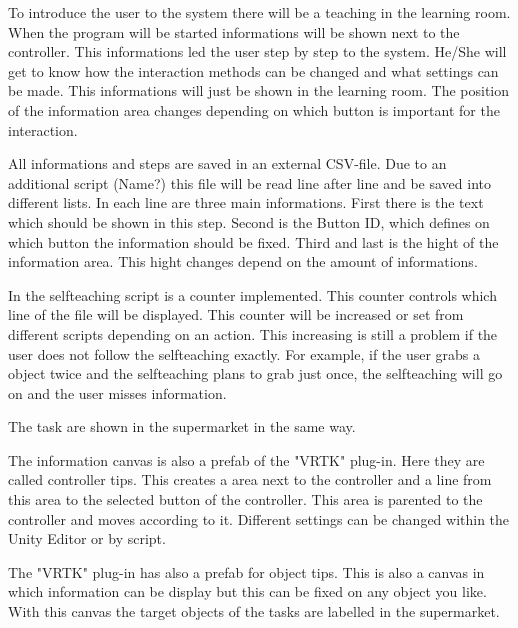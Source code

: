 To introduce the user to the system there will be a teaching in the learning room. When the program will be started informations will be shown next to the controller. This informations led the user step by step to the system. He/She will get to know how the interaction methods can be changed and what settings can be made. This informations will just be shown in the learning room. The position of the information area changes depending on which button is important for the interaction. 

All informations and steps are saved in an external CSV-file. Due to an additional script (Name?) this file will be read line after line and be saved into different lists. In each line are three main informations. First there is the text which should be shown in this step. Second is the Button ID, which defines on which button the information should be fixed. Third and last is the hight of the information area. This hight changes depend on the amount of informations. 

In the selfteaching script is a counter implemented. This counter controls which line of the file will be displayed. This counter will be increased or set from different scripts depending on an action. This increasing is still a problem if the user does not follow the selfteaching exactly. For example, if the user grabs a object twice and the selfteaching plans to grab just once, the selfteaching will go on and the user misses information. 

The task are shown in the supermarket in the same way.

The information canvas is also a prefab of the "VRTK" plug-in. Here they are called controller tips. This creates a area next to the controller and a line from this area to the selected button of the controller. This area is parented to the controller and moves according to it. Different settings can be changed within the Unity Editor or by script.

The "VRTK" plug-in has also a prefab for object tips. This is also a canvas in which information can be display but this can be fixed on any object you like. With this canvas the target objects of the tasks are labelled in the supermarket.


\newpage